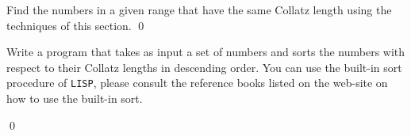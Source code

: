 \documentclass[a4paper,11pt]{article}
\begin{document}
\begin{uexercise}

Find the numbers in a given range that have the same Collatz length using the techniques of this section.
\qed
\end{uexercise}

\begin{uexercise}[*]
Write a program that takes as input a set of numbers and sorts the numbers with respect to their Collatz lengths in descending order. You can use the built-in sort procedure of \Verb+LISP+, please consult the reference books listed on the web-site on how to use the built-in sort.

\qed
\end{uexercise}


\noindent \hrulefill
\newpage

% 
% 
% 
% 
% 
% 
% 
\end{document}
